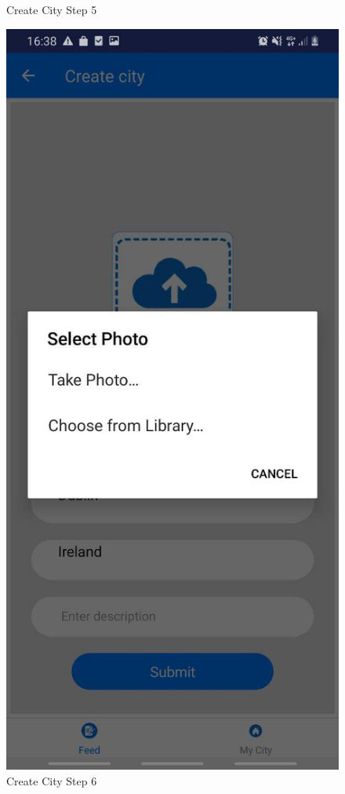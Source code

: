 \begin{figure}[h!]
\begin{minipage}[t]{0.48\textwidth}
\caption{Create City Step 5}
\label{fig:Create City5}
\end{minipage}
\hspace*{\fill} %
\begin{minipage}[t]{0.48\textwidth}
\includegraphics[width=\linewidth,keepaspectratio=true]{img/uploadPhoto.jpg}
\caption{Create City Step 6}
\label{fig:Create City6}
\end{minipage}
\end{figure}



